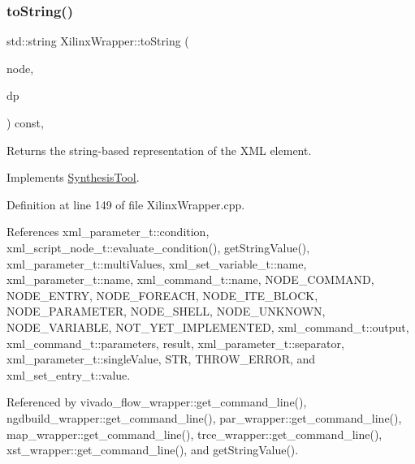 \subsubsection{\texorpdfstring{to\+String()}{toString()}}
{\footnotesize\ttfamily std\+::string Xilinx\+Wrapper\+::to\+String (\begin{DoxyParamCaption}\item[{const \hyperlink{xml__script__command_8hpp_a1fe3d50ade66bc35e41be9b68bbbcd02}{xml\+\_\+script\+\_\+node\+\_\+t\+Ref}}]{node,  }\item[{const \hyperlink{DesignParameters_8hpp_ae36bb1c4c9150d0eeecfe1f96f42d157}{Design\+Parameters\+Ref}}]{dp }\end{DoxyParamCaption}) const\hspace{0.3cm}{\ttfamily [override]}, {\ttfamily [virtual]}}



Returns the string-\/based representation of the X\+ML element. 



Implements \hyperlink{classSynthesisTool_a98c5ba46f950300e1a5ca7cfcb409852}{Synthesis\+Tool}.



Definition at line 149 of file Xilinx\+Wrapper.\+cpp.



References xml\+\_\+parameter\+\_\+t\+::condition, xml\+\_\+script\+\_\+node\+\_\+t\+::evaluate\+\_\+condition(), get\+String\+Value(), xml\+\_\+parameter\+\_\+t\+::multi\+Values, xml\+\_\+set\+\_\+variable\+\_\+t\+::name, xml\+\_\+parameter\+\_\+t\+::name, xml\+\_\+command\+\_\+t\+::name, N\+O\+D\+E\+\_\+\+C\+O\+M\+M\+A\+ND, N\+O\+D\+E\+\_\+\+E\+N\+T\+RY, N\+O\+D\+E\+\_\+\+F\+O\+R\+E\+A\+CH, N\+O\+D\+E\+\_\+\+I\+T\+E\+\_\+\+B\+L\+O\+CK, N\+O\+D\+E\+\_\+\+P\+A\+R\+A\+M\+E\+T\+ER, N\+O\+D\+E\+\_\+\+S\+H\+E\+LL, N\+O\+D\+E\+\_\+\+U\+N\+K\+N\+O\+WN, N\+O\+D\+E\+\_\+\+V\+A\+R\+I\+A\+B\+LE, N\+O\+T\+\_\+\+Y\+E\+T\+\_\+\+I\+M\+P\+L\+E\+M\+E\+N\+T\+ED, xml\+\_\+command\+\_\+t\+::output, xml\+\_\+command\+\_\+t\+::parameters, result, xml\+\_\+parameter\+\_\+t\+::separator, xml\+\_\+parameter\+\_\+t\+::single\+Value, S\+TR, T\+H\+R\+O\+W\+\_\+\+E\+R\+R\+OR, and xml\+\_\+set\+\_\+entry\+\_\+t\+::value.



Referenced by vivado\+\_\+flow\+\_\+wrapper\+::get\+\_\+command\+\_\+line(), ngdbuild\+\_\+wrapper\+::get\+\_\+command\+\_\+line(), par\+\_\+wrapper\+::get\+\_\+command\+\_\+line(), map\+\_\+wrapper\+::get\+\_\+command\+\_\+line(), trce\+\_\+wrapper\+::get\+\_\+command\+\_\+line(), xst\+\_\+wrapper\+::get\+\_\+command\+\_\+line(), and get\+String\+Value().

